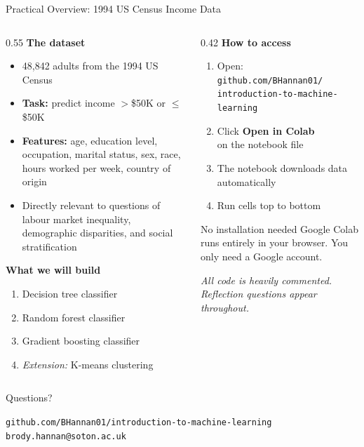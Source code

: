 \documentclass[aspectratio=169, 10pt]{beamer}
\begin{document}
\begin{frame}{Practical Overview: 1994 US Census Income Data}
\begin{columns}[T]
\begin{column}{0.55\textwidth}
\textbf{The dataset}
\begin{itemize}
  \setlength\itemsep{0.35em}
  \item 48,842 adults from the 1994 US Census
  \item \textbf{Task:} predict income $>$\$50K or $\leq$\$50K
  \item \textbf{Features:} age, education level, occupation, marital status, sex, race, hours worked per week, country of origin
  \item Directly relevant to questions of labour market inequality, demographic disparities, and social stratification
\end{itemize}

\vspace{0.5em}
\textbf{What we will build}
\begin{enumerate}
  \item Decision tree classifier
  \item Random forest classifier
  \item Gradient boosting classifier
  \item[] \textit{Extension:} K-means clustering
\end{enumerate}
\end{column}
\begin{column}{0.42\textwidth}
\textbf{How to access}
\vspace{0.4em}

\begin{enumerate}
  \setlength\itemsep{0.4em}
  \item Open:\\
        \small\texttt{github.com/BHannan01/}\\
        \texttt{introduction-to-machine-learning}
  \item Click \textbf{Open in Colab}\\
        on the notebook file
  \item The notebook downloads data automatically
  \item Run cells top to bottom
\end{enumerate}

\vspace{0.8em}
\begin{alertblock}{No installation needed}
Google Colab runs entirely in your browser. You only need a Google account.
\end{alertblock}

\vspace{0.4em}
\small\textit{All code is heavily commented. Reflection questions appear throughout.}
\end{column}
\end{columns}
\end{frame}

\begin{frame}[standout]
\Large Questions?

\vspace{1.2em}
\normalsize
\texttt{github.com/BHannan01/introduction-to-machine-learning}\\[0.4em]
\texttt{brody.hannan@soton.ac.uk}
\end{frame}
\end{document}
